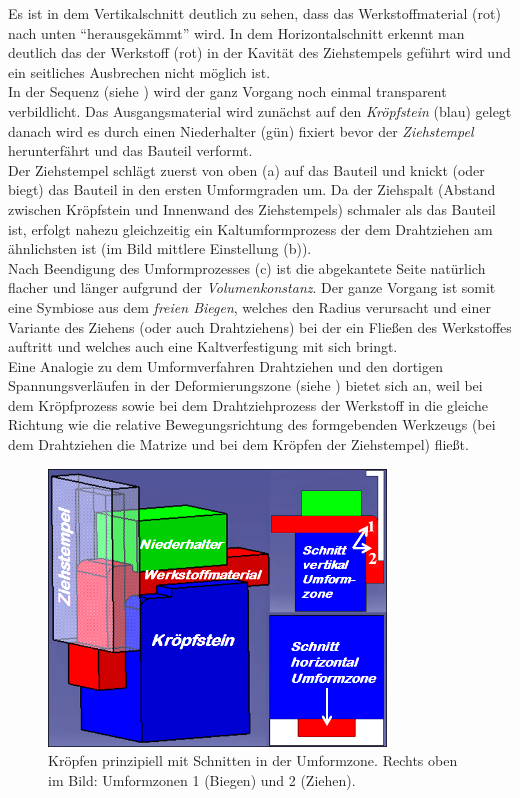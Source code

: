 \documentclass[12pt,a4paper,parskip]{scrartcl}
\begin{document}
 Es ist in dem Vertikalschnitt deutlich zu sehen, dass das Werkstoffmaterial (rot) nach unten "`herausgekämmt"' wird. In dem Horizontalschnitt erkennt man deutlich das der Werkstoff (rot) in der Kavität des Ziehstempels geführt wird und ein seitliches Ausbrechen nicht möglich ist.\\ In der Sequenz (siehe ) wird der ganz Vorgang noch einmal transparent verbildlicht. Das Ausgangsmaterial wird zunächst auf den \emph{Kröpfstein} (blau) gelegt danach wird es durch einen Niederhalter (gün) fixiert bevor der \emph{Ziehstempel} herunterfährt und das Bauteil verformt. \\    Der Ziehstempel schlägt zuerst von oben  (a) auf das Bauteil  und knickt (oder biegt) das Bauteil in den ersten Umformgraden um. Da der Ziehspalt (Abstand zwischen Kröpfstein und Innenwand des Ziehstempels) schmaler als das Bauteil ist, erfolgt nahezu gleichzeitig  ein Kaltumformprozess der dem Drahtziehen am ähnlichsten ist (im Bild mittlere Einstellung (b)). \\ Nach Beendigung des Umformprozesses (c) ist die abgekantete Seite natürlich flacher und länger aufgrund der \emph{Volumenkonstanz}. Der ganze Vorgang ist somit eine Symbiose aus dem \emph{freien Biegen}, welches den Radius verursacht und einer Variante des Ziehens (oder auch Drahtziehens) bei der ein Fließen des Werkstoffes auftritt und welches auch eine Kaltverfestigung mit sich bringt. \\
Eine Analogie zu dem Umformverfahren Drahtziehen und den dortigen Spannungsverläufen in der Deformierungszone (siehe ) bietet sich an, weil bei dem Kröpfprozess sowie bei dem Drahtziehprozess der Werkstoff in die gleiche Richtung wie die relative Bewegungsrichtung des  formgebenden Werkzeugs (bei dem Drahtziehen die Matrize und bei dem Kröpfen der Ziehstempel) fließt.\\
\begin{figure}[hbtp]
\centering
\includegraphics[width=0.8\textwidth]{krpfgesamt.png}
\caption{Kröpfen prinzipiell mit Schnitten in der Umformzone. Rechts oben im Bild: Umformzonen 1 (Biegen) und 2 (Ziehen).}
\label{fig:krpfgesamt}
\end{figure}
\end{document}
